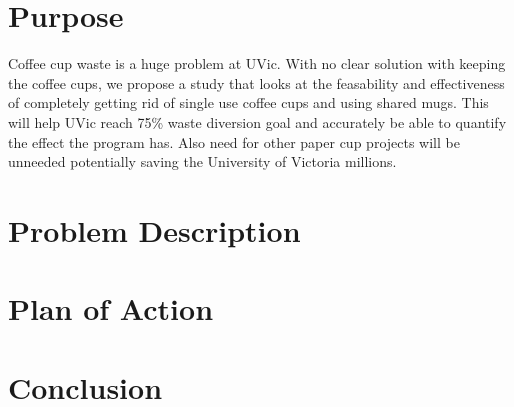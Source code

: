 \documentclass[letterpaper,11pt]{texMemo} %
\begin{document}
\maketitle %


\section {Purpose}
Coffee cup waste is a huge problem at UVic. With no clear solution with keeping the coffee cups, we
propose a study that looks at the feasability and effectiveness of completely getting rid of single
use coffee cups and using shared mugs. This will help UVic reach 75\% waste diversion goal and 
accurately be able to quantify the effect the program has. Also need for other paper cup projects
will be unneeded potentially saving the University of Victoria millions.

\section {Problem Description}

\section {Plan of Action}

\section {Conclusion}

\end{document}
